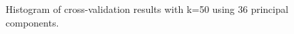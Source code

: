 \documentclass[paper=a4, fontsize=11pt]{scrartcl} %
\begin{document}
\begin{figure}[h]
    \centering
    \caption{Histogram of cross-validation results with k=50 using 36 principal components.}
    \label{fig:hist}
\end{figure}




\begin{flushleft}
\end{flushleft}

\begin{flushleft}
\end{flushleft}
\end{document}
